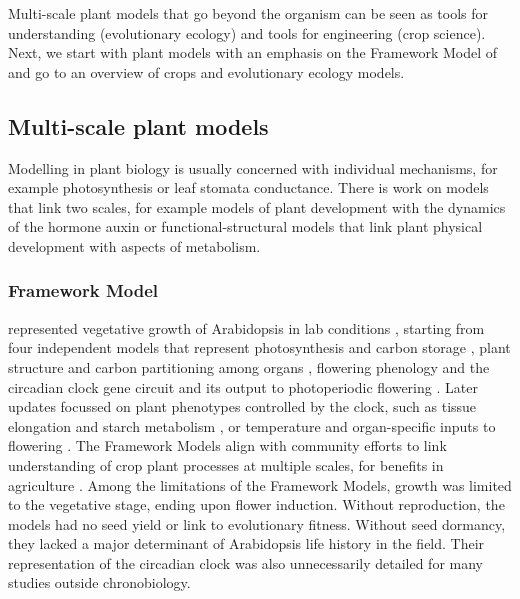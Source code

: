\documentclass[phd]{infthesis}
\begin{document}
Multi-scale plant models that go beyond the organism can be seen as tools for
understanding (evolutionary ecology) and tools for engineering (crop
science). Next, we start with plant models with an emphasis on the Framework
Model of \citet{chew_multiscale_2014} and go to an overview of crops and
evolutionary ecology models.

\subsection{Multi-scale plant models}
Modelling in plant biology is usually concerned with individual mechanisms, for
example photosynthesis or leaf stomata conductance. There is work on models that
link two scales, for example models of plant development with the dynamics of
the hormone auxin or functional-structural models that link plant physical
development with aspects of metabolism.



\subsubsection*{Framework Model}
represented vegetative growth of Arabidopsis in lab conditions
\citep{chew_multiscale_2014}, starting from four independent models that
represent photosynthesis and carbon storage \citep{rasse_leaf_2006}, plant
structure and carbon partitioning among organs
\citep{christophe_model-based_2008}, flowering phenology
\citep{chew_augmented_2012} and the circadian clock gene circuit and its output
to photoperiodic flowering \citep{salazar_prediction_2009}. Later updates
focussed on plant phenotypes controlled by the clock, such as tissue elongation
and starch metabolism \citep[FMv2;][]{chew_linking_2017}, or temperature and
organ-specific inputs to flowering
\citep{kinmonth-schultz_mechanistic_2018}. The Framework Models align with
community efforts to link understanding of crop plant processes at multiple
scales, for benefits in agriculture \citep{wu_connecting_2016,
  zhu_plants_2016}. Among the limitations of the Framework Models, growth was
limited to the vegetative stage, ending upon flower induction. Without
reproduction, the models had no seed yield or link to evolutionary
fitness. Without seed dormancy, they lacked a major determinant of Arabidopsis
life history in the field. Their representation of the circadian clock was also
unnecessarily detailed for many studies outside chronobiology.
\end{document}
